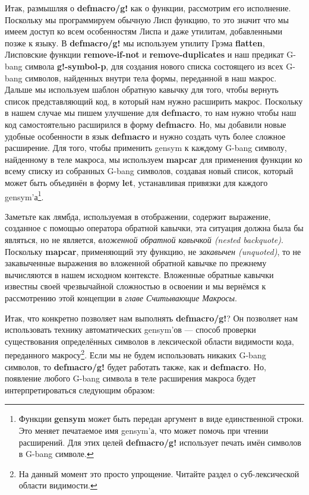 Итак, размышляя о \textbf{defmacro/g!} как о функции, рассмотрим его исполнение. Поскольку мы программируем обычную Лисп функцию, то это значит что мы имеем доступ ко всем особенностям Лиспа и даже утилитам, добавленными позже к языку. В \textbf{defmacro/g!} мы используем утилиту Грэма \textbf{flatten}, Лисповские функции \textbf{remove-if-not} и \textbf{remove-duplicates} и наш предикат G-bang символа \textbf{g!-symbol-p}, для создания нового списка состоящего из всех G-bang символов, найденных внутри тела формы, переданной в наш макрос. Дальше мы используем шаблон обратную кавычку для того, чтобы вернуть список представляющий код, в который нам нужно расширить макрос. Поскольку в нашем случае мы пишем улучшение для \textbf{defmacro}, то нам нужно чтобы наш код самостоятельно расширился в форму \textbf{defmacro}. Но, мы добавили новые удобные особенности в язык \textbf{defmacro} и нужно создать чуть более сложное расширение. Для того, чтобы применить gensym к каждому G-bang символу, найденному в теле макроса, мы используем \textbf{mapcar} для применения функции ко всему списку из собранных G-bang символов, создавая новый список, который может быть объединён в форму \textbf{let}, устанавливая привязки для каждого gensym'а\footnote{Функции \textbf{gensym} может быть передан аргумент в виде единственной строки. Это меняет печатаемое имя gensym'а, что может помочь при чтении расширений. Для этих целей \textbf{defmacro/g!} использует печать имён символов в G-bang символе.}.

Заметьте как лямбда, используемая в отображении, содержит выражение, созданное с помощью оператора обратной кавычки, эта ситуация должна была бы являться, но не является, \emph{вложенной обратной кавычкой (nested backquote)}. Поскольку \textbf{mapcar}, применяющий эту функцию, не \emph{закавычен (unquoted)}, то не закавыченные выражения во вложенной обратной кавычке по прежнему вычисляются в нашем исходном контексте. Вложенные обратные кавычки известны своей чрезвычайной сложностью в освоении и мы вернёмся к рассмотрению этой концепции в \emph{главе Считывающие Макросы}.

Итак, что конкретно позволяет нам выполнять \textbf{defmacro/g!}? Он позволяет нам использовать технику автоматических gensym'ов --- способ проверки существования определённых символов в лексической области видимости кода, переданного макросу\footnote{На данный момент это просто упрощение. Читайте раздел о суб-лексической области видимости.}. Если мы не будем использовать никаких G-bang символов, то \textbf{defmacro/g!} будет работать также, как и \textbf{defmacro}. Но, появление любого G-bang символа в теле расширения макроса будет интерпретироваться следующим образом:

